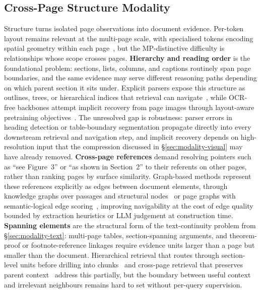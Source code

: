 \subsection{Cross-Page Structure Modality}
\label{sec:modality-structure}
Structure turns isolated page observations into document evidence. Per-token layout remains relevant at the multi-page scale, with specialised tokens encoding spatial geometry within each page~\cite{zhu2025simple}, but the MP-distinctive difficulty is relationships whose scope crosses pages. \textbf{Hierarchy and reading order} is the foundational problem: sections, lists, columns, and captions routinely span page boundaries, and the same evidence may serve different reasoning paths depending on which parent section it sits under. Explicit parsers expose this structure as outlines, trees, or hierarchical indices that retrieval can navigate~\cite{shin2026multidocfusion, sun2025docagent}, while OCR-free backbones attempt implicit recovery from page images through layout-aware pretraining objectives~\cite{yu2024texthawk2, hu2025mplug}. The unresolved gap is robustness: parser errors in heading detection or table-boundary segmentation propagate directly into every downstream retrieval and navigation step, and implicit recovery depends on high-resolution input that the compression discussed in \S\ref{sec:modality-visual} may have already removed. \textbf{Cross-page references} demand resolving pointers such as ``see Figure~3'' or ``as shown in Section~2'' to their referents on other pages, rather than ranking pages by surface similarity. Graph-based methods represent these references explicitly as edges between document elements, through knowledge graphs over passages and structural nodes~\cite{wang2024knowledge} or page graphs with semantic-logical edge scoring~\cite{wu2025molorag}, improving navigability at the cost of edge quality bounded by extraction heuristics or LLM judgement at construction time. \textbf{Spanning elements} are the structural form of the text-continuity problem from \S\ref{sec:modality-text}: multi-page tables, section-spanning arguments, and theorem-proof or footnote-reference linkages require evidence units larger than a page but smaller than the document. Hierarchical retrieval that routes through section-level units before drilling into chunks~\cite{gong2026mhier} and cross-page retrieval that preserves parent context~\cite{qian2026accurate} address this partially, but the boundary between useful context and irrelevant neighbours remains hard to set without per-query supervision.

